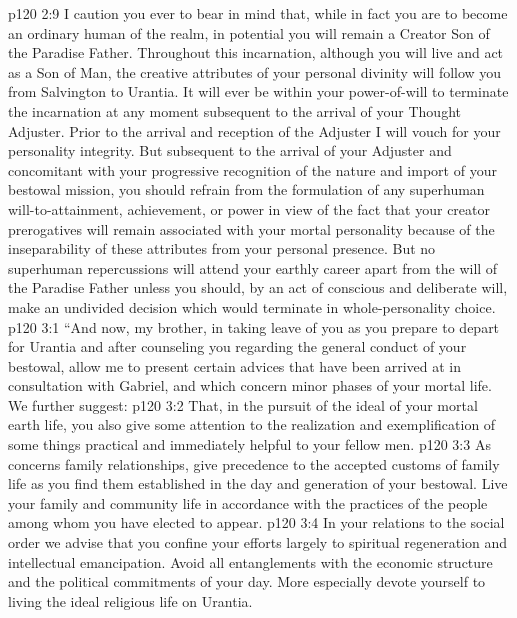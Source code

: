\pc \vs p120 2:9 \bibnobreakspace I caution you ever to bear in mind that, while in fact you are to become an ordinary human of the realm, in potential you will remain a Creator Son of the Paradise Father. Throughout this incarnation, although you will live and act as a Son of Man, the creative attributes of your personal divinity will follow you from Salvington to Urantia. It will ever be within your power\hyp{}of\hyp{}will to terminate the incarnation at any moment subsequent to the arrival of your Thought Adjuster. Prior to the arrival and reception of the Adjuster I will vouch for your personality integrity. But subsequent to the arrival of your Adjuster and concomitant with your progressive recognition of the nature and import of your bestowal mission, you should refrain from the formulation of any superhuman will\hyp{}to\hyp{}attainment, achievement, or power in view of the fact that your creator prerogatives will remain associated with your mortal personality because of the inseparability of these attributes from your personal presence. But no superhuman repercussions will attend your earthly career apart from the will of the Paradise Father unless you should, by an act of conscious and deliberate will, make an undivided decision which would terminate in whole\hyp{}personality choice.
\vs p120 3:1 “And now, my brother, in taking leave of you as you prepare to depart for Urantia and after counseling you regarding the general conduct of your bestowal, allow me to present certain advices that have been arrived at in consultation with Gabriel, and which concern minor phases of your mortal life. We further suggest:
\pc \vs p120 3:2 \bibnobreakspace That, in the pursuit of the ideal of your mortal earth life, you also give some attention to the realization and exemplification of some things practical and immediately helpful to your fellow men.
\pc \vs p120 3:3 \bibnobreakspace As concerns family relationships, give precedence to the accepted customs of family life as you find them established in the day and generation of your bestowal. Live your family and community life in accordance with the practices of the people among whom you have elected to appear.
\pc \vs p120 3:4 \bibnobreakspace In your relations to the social order we advise that you confine your efforts largely to spiritual regeneration and intellectual emancipation. Avoid all entanglements with the economic structure and the political commitments of your day. More especially devote yourself to living the ideal religious life on Urantia.
